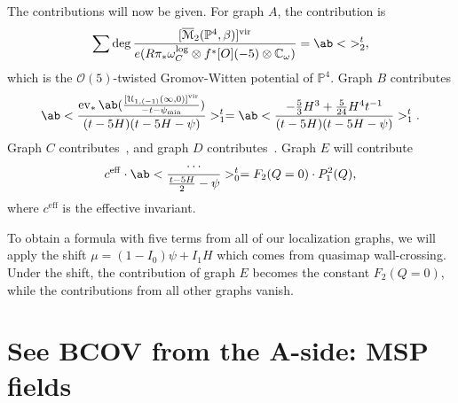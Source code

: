 \documentclass[10pt]{amsart}
\theoremstyle{definition}
\theoremstyle{remark}
\theoremstyle{plain}
\theoremstyle{definition}
\theoremstyle{remark}
\newcommand{\C}{\mathbb{C}}
\renewcommand{\P}{\mathbb{P}}
\newcommand{\Mbar}{\overline{\mathcal{M}}}
\newcommand{\mc}[1]{\mathcal{#1}}
\newcommand{\mr}[1]{\mathrm{#1}}
\newcommand{\1}{\mathbf{1}}
\newcommand{\2}{\mathbf{2}}
\newcommand{\3}{\mathbf{3}}
\newcommand{\vir}{\mr{vir}}
\DeclareMathOperator{\ev}{ev}
\begin{document}
The contributions will now be given. For graph $A$, the contribution is
\begin{align*}
    \sum \deg \frac{[\Mbar_2(\P^4, \beta)]^{\vir}}{e(R\pi_* \omega_C^{\log} \otimes f^* \mc[O](-5) \otimes \C_{\omega})} = \ab<\ >_2^t,
\end{align*}
which is the $\mc{O}(5)$-twisted Gromov-Witten potential of $\P^4$. Graph $B$ contributes
\[ \ab<\frac{\ev_* \ab(\frac{[\mc{U}_{1,(-1)}(\infty,0)]^{\vir}}{-t-\psi_{\min}})}{(t-5H)(t-5H-\psi)}>_1^{t} =  \ab< \frac{-\frac{5}{3}H^3 + \frac{5}{24}H^4t^{-1}}{(t-5H)(t-5H-\psi)}>_1^{t}. \]
Graph $C$ contributes~, and graph $D$ contributes~. Graph $E$ will contribute
\[ c^{\mr{eff}} \cdot \ab<\frac{\cdots}{\frac{t-5H}{2}-\psi}>_0^{t} = F_2(Q=0) \cdot P_1^2(Q), \]
where $c^{\mr{eff}}$ is the effective invariant.


To obtain a formula with five terms from all of our localization graphs, we will apply the shift $\mu = (1-I_0)\psi + I_1 H$ which comes from quasimap wall-crossing. Under the shift, the contribution of graph $E$ becomes the constant $F_2(Q=0)$, while the contributions from all other graphs vanish.
    




\part{See BCOV from the A-side: MSP fields}
\label{pt:msp}
\end{document}
